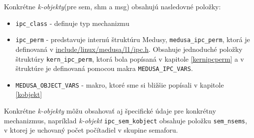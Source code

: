 Konkrétne \textit{k-objekty}(pre \acrshort{sem}, \acrshort{shm} a \acrshort{msg}) obsahujú nasledovné položky:
\begin{itemize}
\item \texttt{ipc\_class} - definuje typ mechanizmu
\item \texttt{ipc\_perm} - predstavuje internú štruktúru Medusy, \texttt{medusa\_ipc\_perm}, ktorá je definovaná v \url{include/linux/medusa/l1/ipc.h}. Obsahuje jednoduché položky štruktúry \texttt{kern\_ipc\_perm}, ktorá bola popísaná v kapitole \ref{kernipcperm} a v štruktúre je definovaná pomocou makra \texttt{MEDUSA\_IPC\_VARS}.
\item \texttt{MEDUSA\_OBJECT\_VARS} - makro, ktoré sme si bližšie popísali v kapitole \ref{kobjekt}
\end{itemize}
Konkrétne \textit{k-objekty} môžu obsahovať aj špecifické údaje pre konkrétny mechanizmus, napríklad \textit{k-objekt} \texttt{ipc\_sem\_kobject} obsahuje položku \texttt{sem\_nsems}, v ktorej je uchovaný počet počítadiel v skupine semaforu.
